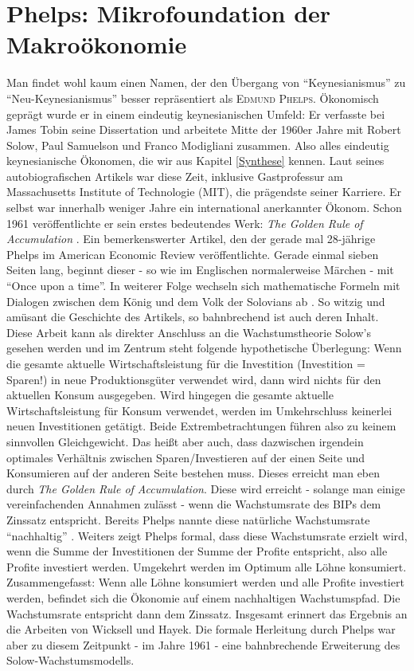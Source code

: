  
 
 

\section{Phelps: Mikrofoundation der Makroökonomie}
\label{micmac}

Man findet wohl kaum einen Namen, der den Übergang von "`Keynesianismus"' zu "`Neu-Keynesianismus"' besser repräsentiert als \textsc{Edmund Phelps}. Ökonomisch geprägt wurde er in einem eindeutig keynesianischen Umfeld: Er verfasste bei James Tobin seine Dissertation und arbeitete Mitte der 1960er Jahre mit Robert Solow, Paul Samuelson und Franco Modigliani zusammen. Also alles eindeutig keynesianische Ökonomen, die wir aus Kapitel \ref{Synthese} kennen. Laut seines autobiografischen Artikels \textcite[S. 93]{Heertje1995} war diese Zeit, inklusive Gastprofessur am Massachusetts Institute of Technologie (MIT), die prägendste seiner Karriere. Er selbst war innerhalb weniger Jahre ein international anerkannter Ökonom. Schon 1961 veröffentlichte er sein erstes bedeutendes Werk: \textit{The Golden Rule of Accumulation} \parencite{Phelps1961}. Ein bemerkenswerter Artikel, den der gerade mal 28-jährige Phelps im American Economic Review veröffentlichte. Gerade einmal sieben Seiten lang, beginnt dieser - so wie im Englischen normalerweise Märchen  - mit "`Once upon a time"'. In weiterer Folge wechseln sich mathematische Formeln mit Dialogen zwischen dem König und dem Volk der Solovians ab \parencite[S. 640]{Phelps1961}. So witzig und amüsant die Geschichte des Artikels, so bahnbrechend ist auch deren Inhalt. Diese Arbeit kann als direkter Anschluss an die Wachstumstheorie Solow's gesehen werden und im Zentrum steht folgende hypothetische Überlegung: Wenn die gesamte aktuelle Wirtschaftsleistung für die Investition (Investition = Sparen!) in neue Produktionsgüter verwendet wird, dann wird nichts für den aktuellen Konsum ausgegeben. Wird hingegen die gesamte aktuelle Wirtschaftsleistung für Konsum verwendet, werden im Umkehrschluss keinerlei neuen Investitionen getätigt. Beide Extrembetrachtungen führen also zu keinem sinnvollen Gleichgewicht. Das heißt aber auch, dass dazwischen irgendein optimales Verhältnis zwischen Sparen/Investieren auf der einen Seite und Konsumieren auf der anderen Seite bestehen muss. Dieses erreicht man eben durch \textit{The Golden Rule of Accumulation}. Diese wird erreicht - solange man einige vereinfachenden Annahmen zulässt - wenn die Wachstumsrate des BIPs dem Zinssatz entspricht. Bereits Phelps nannte diese natürliche Wachstumsrate "`nachhaltig"' \parencite[S. 638]{Phelps1961}. Weiters zeigt Phelps formal, dass diese Wachstumsrate erzielt wird, wenn die Summe der Investitionen der Summe der Profite entspricht, also alle Profite investiert werden. Umgekehrt werden im Optimum alle Löhne konsumiert. Zusammengefasst: Wenn alle Löhne konsumiert werden und alle Profite investiert werden, befindet sich die Ökonomie auf einem nachhaltigen Wachstumspfad. Die Wachstumsrate entspricht dann dem Zinssatz. Insgesamt erinnert das Ergebnis an die Arbeiten von Wicksell und Hayek. Die formale Herleitung durch Phelps war aber zu diesem Zeitpunkt - im Jahre 1961 - eine bahnbrechende Erweiterung des Solow-Wachstumsmodells.

